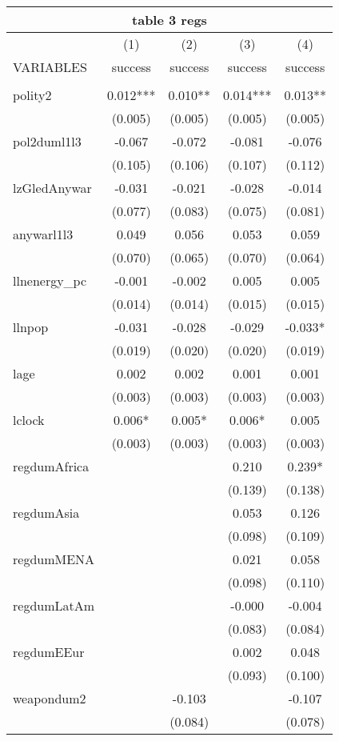 \documentclass[]{article}
\begin{document}
\begin{tabular}{lcccc}
\multicolumn{5}{c}{table 3 regs} \\ \hline
 & (1) & (2) & (3) & (4) \\
VARIABLES & success & success & success & success \\ \hline
 &  &  &  &  \\
polity2 & 0.012*** & 0.010** & 0.014*** & 0.013** \\
 & (0.005) & (0.005) & (0.005) & (0.005) \\
pol2duml1l3 & -0.067 & -0.072 & -0.081 & -0.076 \\
 & (0.105) & (0.106) & (0.107) & (0.112) \\
lzGledAnywar & -0.031 & -0.021 & -0.028 & -0.014 \\
 & (0.077) & (0.083) & (0.075) & (0.081) \\
anywarl1l3 & 0.049 & 0.056 & 0.053 & 0.059 \\
 & (0.070) & (0.065) & (0.070) & (0.064) \\
llnenergy\_pc & -0.001 & -0.002 & 0.005 & 0.005 \\
 & (0.014) & (0.014) & (0.015) & (0.015) \\
llnpop & -0.031 & -0.028 & -0.029 & -0.033* \\
 & (0.019) & (0.020) & (0.020) & (0.019) \\
lage & 0.002 & 0.002 & 0.001 & 0.001 \\
 & (0.003) & (0.003) & (0.003) & (0.003) \\
lclock & 0.006* & 0.005* & 0.006* & 0.005 \\
 & (0.003) & (0.003) & (0.003) & (0.003) \\
regdumAfrica &  &  & 0.210 & 0.239* \\
 &  &  & (0.139) & (0.138) \\
regdumAsia &  &  & 0.053 & 0.126 \\
 &  &  & (0.098) & (0.109) \\
regdumMENA &  &  & 0.021 & 0.058 \\
 &  &  & (0.098) & (0.110) \\
regdumLatAm &  &  & -0.000 & -0.004 \\
 &  &  & (0.083) & (0.084) \\
regdumEEur &  &  & 0.002 & 0.048 \\
 &  &  & (0.093) & (0.100) \\
weapondum2 &  & -0.103 &  & -0.107 \\
 &  & (0.084) &  & (0.078) \\

\end{tabular}
\end{document}
